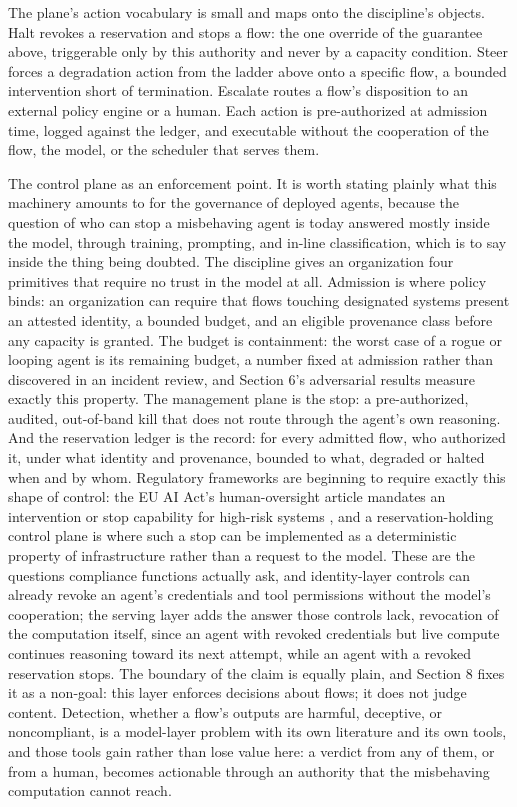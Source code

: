 The plane's action vocabulary is small and maps onto the discipline's
objects. Halt revokes a reservation and stops a flow: the one override of the guarantee above, triggerable only by this authority and never by
a capacity condition. Steer forces a degradation action from the ladder above onto a specific flow, a bounded intervention short of
termination. Escalate routes a flow's disposition to an external policy
engine or a human. Each action is pre-authorized at admission time,
logged against the ledger, and executable without the cooperation of the
flow, the model, or the scheduler that serves them.

The control plane as an enforcement point. It is worth stating plainly
what this machinery amounts to for the governance of deployed agents,
because the question of who can stop a misbehaving agent is today
answered mostly inside the model, through training, prompting, and
in-line classification, which is to say inside the thing being doubted.
The discipline gives an organization four primitives that require no
trust in the model at all. Admission is where policy binds: an
organization can require that flows touching designated systems present
an attested identity, a bounded budget, and an eligible provenance class
before any capacity is granted. The budget is containment: the worst
case of a rogue or looping agent is its remaining budget, a number fixed
at admission rather than discovered in an incident review, and Section
6's adversarial results measure exactly this property. The management
plane is the stop: a pre-authorized, audited, out-of-band kill that does
not route through the agent's own reasoning. And the reservation ledger
is the record: for every admitted flow, who authorized it, under what
identity and provenance, bounded to what, degraded or halted when and by
whom. Regulatory frameworks are beginning to require exactly this shape
of control: the EU AI Act's human-oversight article mandates an
intervention or stop capability for high-risk systems \citep{euaiact_art14},
and a reservation-holding control plane is where such a stop can be
implemented as a deterministic property of infrastructure rather than a
request to the model. These are the questions compliance functions
actually ask, and identity-layer controls can already revoke an agent's
credentials and tool permissions without the model's cooperation; the
serving layer adds the answer those controls lack, revocation of the
computation itself, since an agent with revoked credentials but live
compute continues reasoning toward its next attempt, while an agent with
a revoked reservation stops. The boundary of the claim is equally plain,
and Section 8 fixes it as a non-goal: this layer enforces decisions
about flows; it does not judge content. Detection, whether a flow's
outputs are harmful, deceptive, or noncompliant, is a model-layer problem
with its own literature and its own tools, and those tools gain rather
than lose value here: a verdict from any of them, or from a human,
becomes actionable through an authority that the misbehaving computation
cannot reach.

